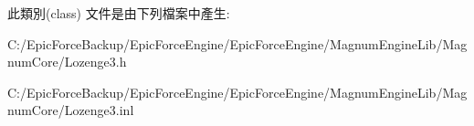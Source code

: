 此類別(class) 文件是由下列檔案中產生\+:\begin{DoxyCompactItemize}
\item 
C\+:/\+Epic\+Force\+Backup/\+Epic\+Force\+Engine/\+Epic\+Force\+Engine/\+Magnum\+Engine\+Lib/\+Magnum\+Core/Lozenge3.\+h\item 
C\+:/\+Epic\+Force\+Backup/\+Epic\+Force\+Engine/\+Epic\+Force\+Engine/\+Magnum\+Engine\+Lib/\+Magnum\+Core/Lozenge3.\+inl\end{DoxyCompactItemize}
